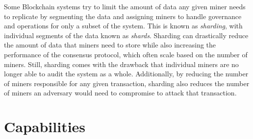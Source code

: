 

Some Blockchain systems try to limit the amount of data any given miner needs to replicate by segmenting the data and assigning miners to handle governance and operations for only a subset of the system.
This is known as \emph{sharding}, with individual segments of the data known as \emph{shards}.
Sharding can drastically reduce the amount of data that miners need to store while also increasing the performance of the consensus protocol, which often scale based on the number of miners.
Still, sharding comes with the drawback that individual miners are no longer 
able to audit the system as a whole.
Additionally, by reducing the number of miners responsible for any given transaction, sharding also reduces the number of miners an adversary would need to compromise to attack that transaction.

\section{Capabilities}
\label{sec:capabilities}


